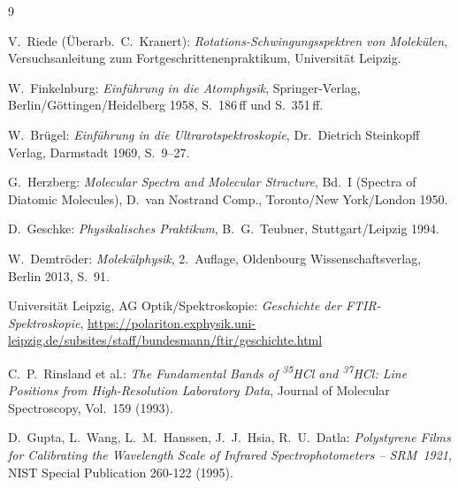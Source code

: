 \documentclass[11pt,a4paper]{article}
\begin{document}
\newpage
\begin{thebibliography}{9}

  V.~Riede (Überarb.\ C.~Kranert):
  \emph{Rotations-Schwingungsspektren von Molekülen},
  Versuchsanleitung zum Fortgeschrittenenpraktikum,
  Universität Leipzig.

  W.~Finkelnburg:
  \emph{Einführung in die Atomphysik},
  Springer-Verlag, Berlin/Göttingen/Heidelberg 1958, S.~186\,ff und S.~351\,ff.

  W.~Brügel:
  \emph{Einführung in die Ultrarotspektroskopie},
  Dr.\ Dietrich Steinkopff Verlag, Darmstadt 1969, S.~9--27.

  G.~Herzberg:
  \emph{Molecular Spectra and Molecular Structure},
  Bd.~I (Spectra of Diatomic Molecules),
  D.~van Nostrand Comp., Toronto/New York/London 1950.

  D.~Geschke:
  \emph{Physikalisches Praktikum},
  B.~G.~Teubner, Stuttgart/Leipzig 1994.

  W.~Demtröder:
  \emph{Molekülphysik}, 2.~Auflage,
  Oldenbourg Wissenschaftsverlag, Berlin 2013, S.~91.

  Universität Leipzig, AG Optik/Spektroskopie:
  \emph{Geschichte der FTIR-Spektroskopie},
  \url{https://polariton.exphysik.uni-leipzig.de/subsites/staff/bundesmann/ftir/geschichte.html}

  C.~P.~Rinsland et al.:
  \emph{The Fundamental Bands of \textsuperscript{35}HCl and \textsuperscript{37}HCl:
  Line Positions from High-Resolution Laboratory Data},
  Journal of Molecular Spectroscopy, Vol.~159 (1993).

  D.~Gupta, L.~Wang, L.~M.~Hanssen, J.~J.~Hsia, R.~U.~Datla:
  \emph{Polystyrene Films for Calibrating the Wavelength Scale of Infrared
  Spectrophotometers -- SRM~1921},
  NIST Special Publication 260-122 (1995).

\end{thebibliography}
\end{document}
